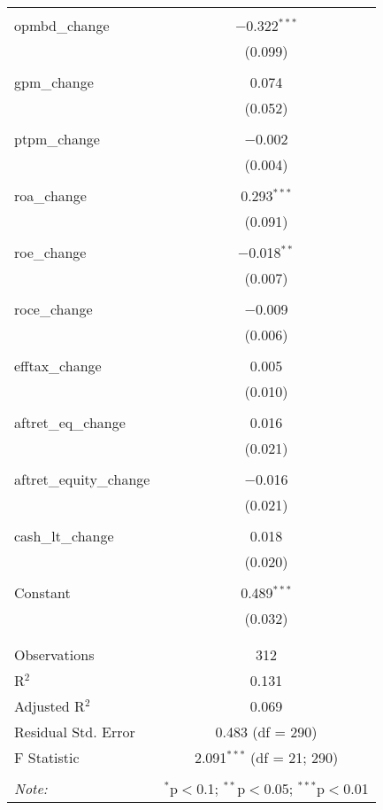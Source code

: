 \documentclass{article}
\begin{document}
\begin{table}[!htbp]
\begin{tabular}{@{\extracolsep{0pt}}lc}
    & \\ 
   opmbd\_change & $-$0.322$^{***}$ \\ 
    & (0.099) \\ 
    & \\ 
   gpm\_change & 0.074 \\ 
    & (0.052) \\ 
    & \\ 
   ptpm\_change & $-$0.002 \\ 
    & (0.004) \\ 
    & \\ 
   roa\_change & 0.293$^{***}$ \\ 
    & (0.091) \\ 
    & \\ 
   roe\_change & $-$0.018$^{**}$ \\ 
    & (0.007) \\ 
    & \\ 
   roce\_change & $-$0.009 \\ 
    & (0.006) \\ 
    & \\ 
   efftax\_change & 0.005 \\ 
    & (0.010) \\ 
    & \\ 
   aftret\_eq\_change & 0.016 \\ 
    & (0.021) \\ 
    & \\ 
   aftret\_equity\_change & $-$0.016 \\ 
    & (0.021) \\ 
    & \\ 
   cash\_lt\_change & 0.018 \\ 
    & (0.020) \\ 
    & \\ 
   Constant & 0.489$^{***}$ \\ 
    & (0.032) \\ 
    & \\ 
  \hline \\[-1.8ex] 
  Observations & 312 \\ 
  R$^{2}$ & 0.131 \\ 
  Adjusted R$^{2}$ & 0.069 \\ 
  Residual Std. Error & 0.483 (df = 290) \\ 
  F Statistic & 2.091$^{***}$ (df = 21; 290) \\ 
  \hline 
  \hline \\[-1.8ex] 
  \textit{Note:}  & \multicolumn{1}{r}{$^{*}$p$<$0.1; $^{**}$p$<$0.05; $^{***}$p$<$0.01} \\ 
  \end{tabular} 
  \end{table} 
\end{document}
